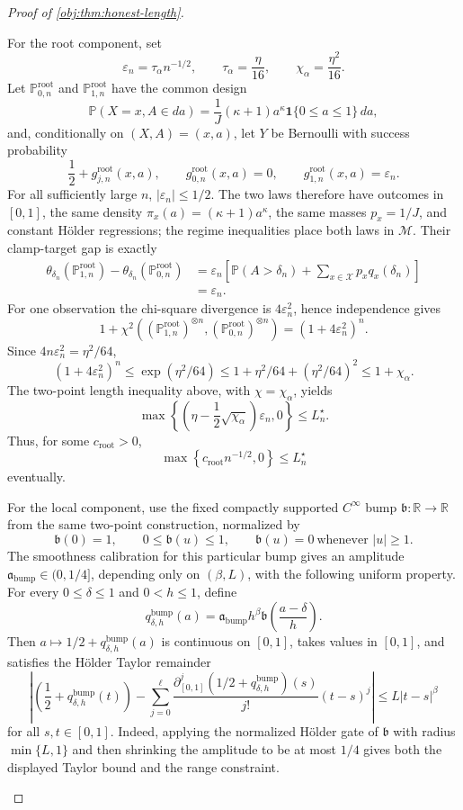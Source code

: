 \begin{proof}[Proof of \cref{obj:thm:honest-length}]
\begin{enumerate}
For the root component, set
\[
\varepsilon_n=\tau_\alpha n^{-1/2},
\qquad
\tau_\alpha=\frac{\eta}{16},
\qquad
\chi_\alpha=\frac{\eta^2}{16}.
\]
Let \(\mathbb P^{\mathrm{root}}_{0,n}\) and \(\mathbb P^{\mathrm{root}}_{1,n}\) have the common design
\[
\mathbb P(X=x,A\in da)=\frac1J(\kappa+1)a^\kappa\mathbf 1\{0\leq a\leq1\}\,da,
\]
and, conditionally on \((X,A)=(x,a)\), let \(Y\) be Bernoulli with success probability
\[
\frac12+g^{\mathrm{root}}_{j,n}(x,a),
\qquad
g^{\mathrm{root}}_{0,n}(x,a)=0,\qquad
g^{\mathrm{root}}_{1,n}(x,a)=\varepsilon_n .
\]
For all sufficiently large \(n\), \(|\varepsilon_n|\leq1/2\). The two laws therefore have outcomes in \([0,1]\), the same density \(\pi_x(a)=(\kappa+1)a^\kappa\), the same masses \(p_x=1/J\), and constant Hölder regressions; the regime inequalities place both laws in \(\mathcal M\). Their clamp-target gap is exactly
\[
\begin{aligned}
\theta_{\delta_n}(\mathbb P^{\mathrm{root}}_{1,n})
-\theta_{\delta_n}(\mathbb P^{\mathrm{root}}_{0,n})
&=\varepsilon_n
\left[
\mathbb P(A>\delta_n)+\sum_{x\in\mathcal X}p_xq_x(\delta_n)
\right] \\
&=\varepsilon_n .
\end{aligned}
\]
For one observation the chi-square divergence is \(4\varepsilon_n^2\), hence independence gives
\[
1+\chi^2\!\left((\mathbb P^{\mathrm{root}}_{1,n})^{\otimes n},
(\mathbb P^{\mathrm{root}}_{0,n})^{\otimes n}\right)
=(1+4\varepsilon_n^2)^n.
\]
Since \(4n\varepsilon_n^2=\eta^2/64\),
\[
(1+4\varepsilon_n^2)^n
\le \exp(\eta^2/64)
\le 1+\eta^2/64+(\eta^2/64)^2
\le 1+\chi_\alpha .
\]
The two-point length inequality above, with \(\chi=\chi_\alpha\), yields
\[
\max\!\left\{
\left(\eta-\frac12\sqrt{\chi_\alpha}\right)\varepsilon_n,0
\right\}
\le L_n^\star .
\]
Thus, for some \(c_{\mathrm{root}}>0\),
\[
\max\!\left\{c_{\mathrm{root}}n^{-1/2},0\right\}
\le L_n^\star
\]
eventually.

For the local component, use the fixed compactly supported \(C^\infty\) bump \(\mathfrak b:\mathbb R\to\mathbb R\) from the same two-point construction, normalized by
\[
\mathfrak b(0)=1,
\qquad
0\leq\mathfrak b(u)\leq1,
\qquad
\mathfrak b(u)=0\ \text{whenever } |u|\geq1 .
\]
The smoothness calibration for this particular bump gives an amplitude
\(\mathfrak a_{\mathrm{bump}}\in(0,1/4]\), depending only on \((\beta,L)\), with the following uniform property. For every \(0\leq\delta\leq1\) and \(0<h\leq1\), define
\[
q_{\delta,h}^{\mathrm{bump}}(a)
=
\mathfrak a_{\mathrm{bump}}h^\beta
\mathfrak b\!\left(\frac{a-\delta}{h}\right).
\]
Then \(a\mapsto 1/2+q_{\delta,h}^{\mathrm{bump}}(a)\) is continuous on \([0,1]\), takes values in \([0,1]\), and satisfies the Hölder Taylor remainder
\[
\left|
\left(\frac12+q_{\delta,h}^{\mathrm{bump}}(t)\right)
-
\sum_{j=0}^{\ell}
\frac{\partial_{[0,1]}^j(1/2+q_{\delta,h}^{\mathrm{bump}})(s)}{j!}(t-s)^j
\right|
\le L|t-s|^\beta
\]
for all \(s,t\in[0,1]\). Indeed, applying the normalized Hölder gate of \(\mathfrak b\) with radius \(\min\{L,1\}\) and then shrinking the amplitude to be at most \(1/4\) gives both the displayed Taylor bound and the range constraint.


\end{enumerate}
\end{proof}
